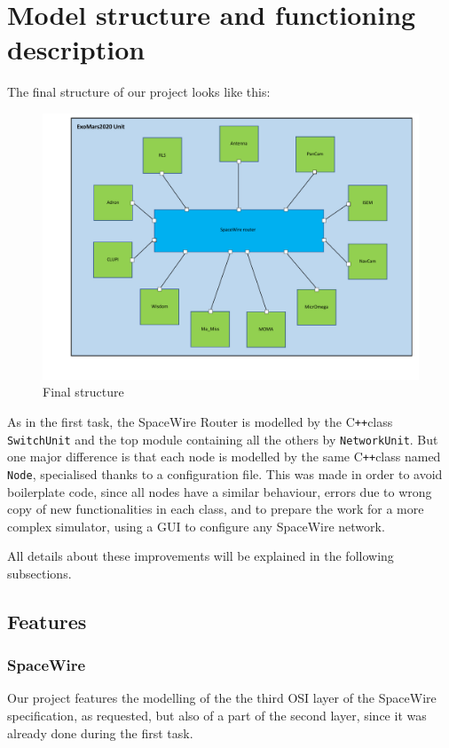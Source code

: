 \documentclass[12pt,a4paper]{article}
\newcommand{\Cpp}{C\texttt{++}}
\begin{document}
\section{Model structure and functioning description}
\smallbreak
The final structure of our project looks like this: \smallbreak
\begin{figure}[h]
\centering
\includegraphics[scale=.5]{pictures/structure_ExoMars2020.pdf}
\caption{Final structure}
\end{figure}
\smallbreak

As in the first task, the SpaceWire Router is modelled by the \Cpp class \texttt{SwitchUnit} and the top module containing all the others by \texttt{NetworkUnit}. But one major difference is that each node is modelled by the same \Cpp class named \texttt{Node}, specialised thanks to a configuration file. This was made in order to avoid boilerplate code, since all nodes have a similar behaviour, errors due to wrong copy of new functionalities in each class, and to prepare the work for a more complex simulator, using a GUI to configure any SpaceWire network.

All details about these improvements will be explained in the following subsections.

\subsection{Features}
\subsubsection*{SpaceWire}
Our project features the modelling of the the third OSI layer of the SpaceWire specification, as requested, but also of a part of the second layer, since it was already done during the first task.
\end{document}
